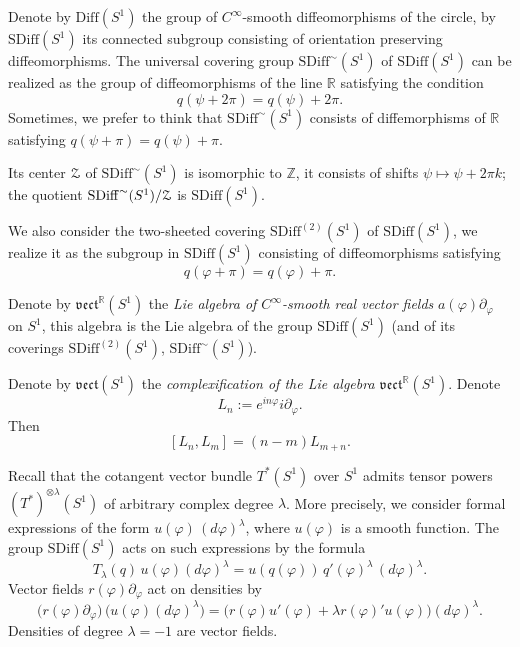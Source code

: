 \documentclass[]{amsart}
\def\phi{\varphi}
\def\cZ{\EuScript Z}
\def\R {{\mathbb R }}
\def\Z{{\mathbb Z}}
\def\sm{\smallskip}
\def\Diff{\mathrm{Diff}}
\def\SDiff{\mathrm{SDiff}}
\def\vect{\mathfrak{vect}}
\begin{document}
Denote by $\Diff(S^1)$ the group  of $C^\infty$-smooth  diffeomorphisms of the circle, by $\SDiff(S^1)$ its connected subgroup consisting of orientation preserving diffeomorphisms.  
The universal covering group $\SDiff^\sim(S^1)$ of $\SDiff(S^1)$
can be realized as the group
of diffeomorphisms of the line $\R$ satisfying the condition
\begin{equation}
q(\psi+2\pi)=q(\psi)+2\pi.
\label{eq:Diff-covering}
\end{equation}
Sometimes, we prefer to think 
that $\SDiff^\sim(S^1)$ consists of diffemorphisms
of $\R$ satisfying $q(\psi+\pi)=q(\psi)+\pi$.

Its center $\cZ$ of $\SDiff^\sim(S^1)$
 is isomorphic to $\Z$, it consists of shifts $\psi\mapsto \psi+2\pi k$;
the quotient $\SDiff^\sim(S^1)/\cZ$ is $\SDiff(S^1)$.  

We also consider the two-sheeted covering $\SDiff^{(2)}(S^1)$ of $\SDiff(S^1)$, 
we realize it as the  subgroup  
in $\SDiff(S^1)$ consisting of diffeomorphisms satisfying
$$
q(\phi+\pi)=q(\phi)+\pi.
$$

\sm

Denote by $\vect^\R(S^1)$ the {\it Lie algebra of
$C^\infty$-smooth
real vector fields} $a(\phi) \partial_\phi$
on $S^1$, this algebra is the Lie algebra of the group $\SDiff(S^1)$
(and of its coverings $\SDiff^{(2)}(S^1)$, $\SDiff^{\sim}(S^1)$).

Denote by $\vect(S^1)$ the {\it complexification of the Lie
algebra $\vect^\R(S^1)$}.
 Denote 
 $$L_n:=e^{in\phi}i\partial_\phi.$$
  Then
$$
[L_n,L_m]=(n-m) L_{m+n}.
$$


Recall that the  cotangent vector bundle $T^*(S^1)$ over $S^1$ admits  tensor powers $(T^*)^{\otimes \lambda} (S^1)$ of arbitrary complex degree $\lambda$.
 More precisely, we consider formal expressions of the form
 $u(\phi)\, (d\phi)^\lambda$, where $u(\phi)$ is a smooth function. The group
 $\SDiff(S^1)$  acts on such expressions  
by the formula
$$
T_\lambda (q)\, u(\phi) (d\phi)^\lambda=u(q(\phi))\,q'(\phi)^\lambda \,
(d\phi)^\lambda.
$$ 
Vector fields $r(\phi)\partial_\phi$ act on densities by
$$
\bigl(r(\phi) \partial_\phi\bigr)\, \bigl(u(\phi) (d\phi)^\lambda\bigr)=
\bigl(r(\phi) u'(\phi)+\lambda r(\phi)' u(\phi)\bigr)(d\phi)^\lambda.
$$   
Densities of degree $\lambda=-1$ are vector fields.
\end{document}
